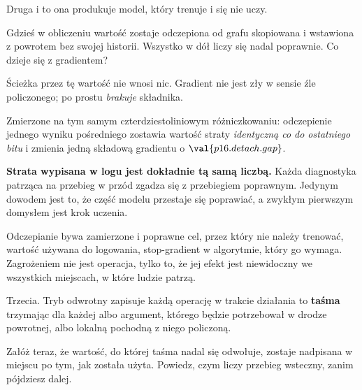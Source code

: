 \begin{fr}
Druga i to ona produkuje model, który trenuje i się nie uczy.

Gdzieś w obliczeniu wartość zostaje odczepiona od grafu \dash{} skopiowana i
wstawiona z powrotem bez swojej historii. Wszystko w dół liczy się nadal
poprawnie. Co dzieje się z gradientem?
\nextframe
\end{fr}

\begin{fr}
\begin{ansblock}
Ścieżka przez tę wartość nie wnosi nic. Gradient nie jest zły w sensie źle
policzonego; po prostu \emph{brakuje} składnika.
\end{ansblock}

Zmierzone na tym samym czterdziestoliniowym różniczkowaniu: odczepienie jednego
wyniku pośredniego zostawia wartość straty \emph{identyczną co do ostatniego
bitu} i zmienia jedną składową gradientu o $\val{p16.detach.gap}$.

\textbf{Strata wypisana w logu jest dokładnie tą samą liczbą.} Każda
diagnostyka patrząca na przebieg w przód zgadza się z przebiegiem poprawnym.
Jedynym dowodem jest to, że część modelu przestaje się poprawiać, a zwykłym
pierwszym domysłem jest krok uczenia.

\begin{note}
Odczepianie bywa zamierzone i poprawne \dash{} cel, przez który nie należy
trenować, wartość używana do logowania, stop-gradient w algorytmie, który go
wymaga. Zagrożeniem nie jest operacja, tylko to, że jej efekt jest niewidoczny
we wszystkich miejscach, w które ludzie patrzą.
\end{note}
\end{fr}

\begin{fr}
Trzecia. Tryb odwrotny zapisuje każdą operację w trakcie działania \dash{}
to \textbf{taśma} \dash{} trzymając dla każdej albo argument, którego będzie
potrzebował w drodze powrotnej, albo lokalną pochodną z niego policzoną.

Załóż teraz, że wartość, do której taśma nadal się odwołuje, zostaje nadpisana
w miejscu po tym, jak została użyta. Powiedz, czym liczy przebieg wsteczny,
zanim pójdziesz dalej.
\dotline
\nextframe
\end{fr}

